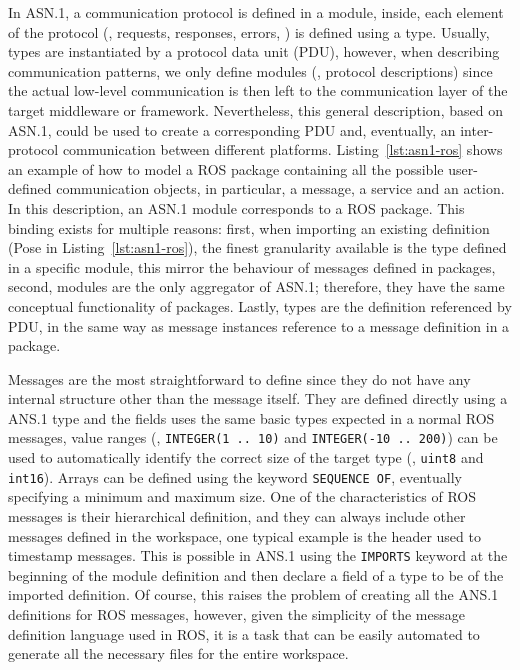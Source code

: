 In ASN.1, a communication protocol is defined in a module, inside, each element of the protocol (\eg, requests, responses, errors, \etc) is defined using a type. Usually, types are instantiated by a protocol data unit (PDU), however, when describing communication patterns, we only define modules (\ie, protocol descriptions) since the actual low-level communication is then left to the communication layer of the target middleware or framework. Nevertheless, this general description, based on ASN.1, could be used to create a corresponding PDU and, eventually, an inter-protocol communication between different platforms. Listing~\ref{lst:asn1-ros} shows an example of how to model a ROS package containing all the possible user-defined communication objects, in particular, a message, a service and an action. In this description, an ASN.1 module corresponds to a ROS package. This binding exists for multiple reasons: first, when importing an existing definition (Pose in Listing~\ref{lst:asn1-ros}), the finest granularity available is the type defined in a specific module, this mirror the behaviour of messages defined in packages, second, modules are the only aggregator of ASN.1; therefore, they have the same conceptual functionality of packages. Lastly, types are the definition referenced by PDU, in the same way as message instances reference to a message definition in a package.

Messages are the most straightforward to define since they do not have any internal structure other than the message itself. They are defined directly using a ANS.1 type and the fields uses the same basic types expected in a normal ROS messages, value ranges (\eg, \texttt{INTEGER(1 .. 10)} and \texttt{INTEGER(-10 .. 200)}) can be used to automatically identify the correct size of the target type (\eg, \texttt{uint8} and \texttt{int16}). Arrays can be defined using the keyword \texttt{SEQUENCE OF}, eventually specifying a minimum and maximum size. One of the characteristics of ROS messages is their hierarchical definition, and they can always include other messages defined in the workspace, one typical example is the header used to timestamp messages. This is possible in ANS.1 using the \texttt{IMPORTS} keyword at the beginning of the module definition and then declare a field of a type to be of the imported definition. Of course, this raises the problem of creating all the ANS.1 definitions for ROS messages, however, given the simplicity of the message definition language used in ROS, it is a task that can be easily automated to generate all the necessary files for the entire workspace.

